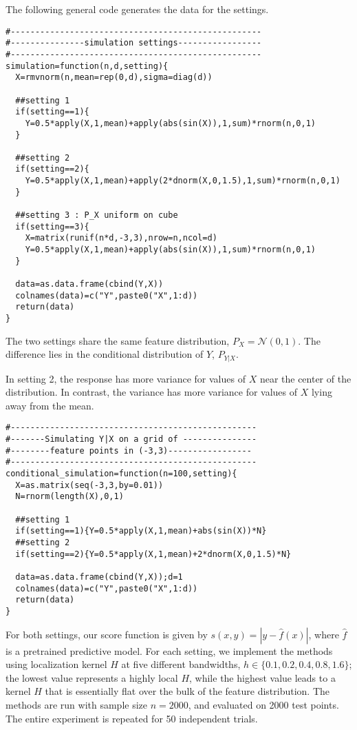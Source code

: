 \documentclass[UTF8, a4paper]{article}
\begin{document}
The following general code generates the data for the settings.
\begin{verbatim}
#---------------------------------------------------
#---------------simulation settings-----------------
#---------------------------------------------------
simulation=function(n,d,setting){
  X=rmvnorm(n,mean=rep(0,d),sigma=diag(d))
  
  ##setting 1
  if(setting==1){
    Y=0.5*apply(X,1,mean)+apply(abs(sin(X)),1,sum)*rnorm(n,0,1)
  }
  
  ##setting 2
  if(setting==2){
    Y=0.5*apply(X,1,mean)+apply(2*dnorm(X,0,1.5),1,sum)*rnorm(n,0,1)
  }
  
  ##setting 3 : P_X uniform on cube
  if(setting==3){
    X=matrix(runif(n*d,-3,3),nrow=n,ncol=d)
    Y=0.5*apply(X,1,mean)+apply(abs(sin(X)),1,sum)*rnorm(n,0,1)
  }
  
  data=as.data.frame(cbind(Y,X))
  colnames(data)=c("Y",paste0("X",1:d))
  return(data)
}
\end{verbatim}

The two settings share the same feature distribution, 
\(P_X = \mathcal{N}(0, 1)\).
The difference lies in the conditional distribution of \(Y\), \(P_{Y|X}\).

In setting 2, the response has more variance for values of \(X\)
near the center of the distribution.
In contrast, the variance has more variance for values
of \(X\) lying away from the mean.

\begin{verbatim}
#--------------------------------------------------
#-------Simulating Y|X on a grid of ---------------
#--------feature points in (-3,3)-----------------
#--------------------------------------------------
conditional_simulation=function(n=100,setting){
  X=as.matrix(seq(-3,3,by=0.01))
  N=rnorm(length(X),0,1)
  
  ##setting 1
  if(setting==1){Y=0.5*apply(X,1,mean)+abs(sin(X))*N}
  ##setting 2
  if(setting==2){Y=0.5*apply(X,1,mean)+2*dnorm(X,0,1.5)*N}
  
  data=as.data.frame(cbind(Y,X));d=1
  colnames(data)=c("Y",paste0("X",1:d))
  return(data)
}
\end{verbatim}

For both settings, our {\color{blue}score function} is 
given by \(s(x, y) = |y - \hat{f}(x)|\), where \(\hat{f}\)
is a pretrained predictive model.
For each setting, we implement the methods using localization
kernel $H$ at five different bandwidths, $h \in\{0.1,0.2,0.4,0.8,1.6\}$; 
the lowest value represents a highly local $H$, while the highest value leads to a kernel $H$ 
that is essentially flat over the bulk of the feature distribution. 
The methods are run with sample size $n=2000$, and evaluated on 2000 test points. 
The entire experiment is repeated for 50 independent trials.
\end{document}
